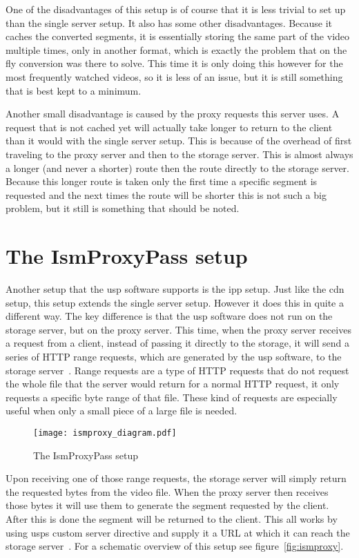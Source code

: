 \documentclass[twoside,openright]{uva-bachelor-thesis}
\begin{document}
One of the disadvantages of this setup is of course that it is less trivial to
set up than the single server setup. It also has some other disadvantages.
Because it caches the converted segments, it is essentially storing the same
part of the video multiple times, only in another format, which is exactly the
problem that on the fly conversion was there to solve. This time it is only
doing this however for the most frequently watched videos, so it is less of an
issue, but it is still something that is best kept to a minimum.

Another small disadvantage is caused by the proxy requests this server uses. A
request that is not cached yet will actually take longer to return to the
client than it would with the single server setup. This is because of the
overhead of first traveling to the proxy server and then to the storage server.
This is almost always a longer (and never a shorter) route then the route
directly to the storage server. Because this longer route is taken only the
first time a specific segment is requested and the next times the route will be
shorter this is not such a big problem, but it still is something that should be
noted.


\section{The IsmProxyPass setup}
Another setup that the \gls{usp} software supports is the \gls{ipp} setup. Just
like the \gls{cdn} setup, this setup extends the single server setup. However it
does this in quite a different way. The key difference is that the \gls{usp}
software does not run on the storage server, but on the proxy server. This
time, when the proxy server receives a request from a client, instead of passing
it directly to the storage, it will send a series of HTTP range requests, which
are generated by the \gls{usp} software, to the storage
server~\autocite{rangerequests}. Range requests are a type of HTTP requests that
do not request the whole file that the server would return for a normal HTTP
request, it only requests a specific byte range of that file.  These kind of
requests are especially useful when only a small piece of a large file is
needed.

\begin{figure}[h]
    \texttt{[image: ismproxy\_diagram.pdf]}
    \caption{The IsmProxyPass setup}\label{fig:ismproxy}
\end{figure}

Upon receiving one of those range requests, the storage server will simply
return the requested bytes from the video file. When the proxy server then
receives those bytes it will use them to generate the segment requested by the
client.  After this is done the segment will be returned to the client. This all
works by using \glspl{usp} custom \ipplong server directive and supply it a URL
at which it can reach the storage server~\autocites{uspismproxy}. For a
schematic overview of this setup see figure~\vref{fig:ismproxy}.
\end{document}
